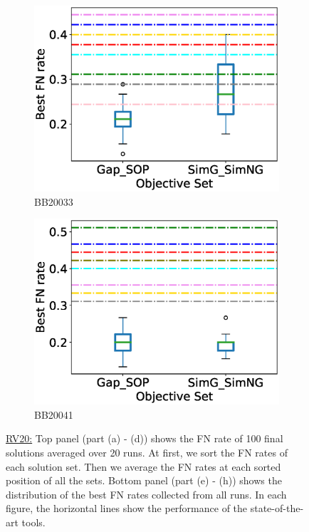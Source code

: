 \begin{figure}[!htbp]
\begin{adjustwidth}{-1cm}{-1cm}
\begin{subfigure}{0.22\textwidth}
			\includegraphics[width=\columnwidth]{Figure/summary/precomputedInit/Balibase/BB20033_objset_fnrate_rank}
			\caption{BB20033}
		\end{subfigure}
		\begin{subfigure}{0.22\textwidth}
			\includegraphics[width=\columnwidth]{Figure/summary/precomputedInit/Balibase/BB20041_objset_fnrate_rank}
			\caption{BB20041}
		\end{subfigure}
		\caption{\underline{RV20:} Top panel (part (a) - (d)) shows the FN rate of 100 final solutions averaged over 20 runs. At first, we sort the FN rates of each solution set. Then we average the FN rates at each sorted position of all the sets. Bottom panel (part (e) - (h)) shows the distribution of the best FN rates collected from all runs. In each figure, the horizontal lines show the performance of the state-of-the-art tools.}
		\label{fig:rv20_fn_rate}
	\end{adjustwidth}
\end{figure}


